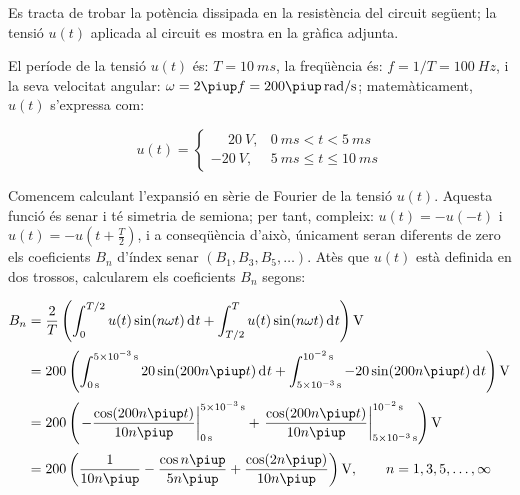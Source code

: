 \begin{exemple}\label{ex:CircuitFourier}
	\addcontentsxms{\CircuitFourier}
     Es tracta de trobar la potència
     dissipada en la resistència del circuit següent; la tensió $u(t)$ aplicada al circuit     es mostra en la gràfica adjunta.

    \begin{center}
        
    \end{center}

     El període de la tensió $u(t)$ és: $T=\qty{10}{ms}$, la freqüència és: $f=1/T=\qty{100}{Hz}$, i la
    seva velocitat angular: $\omega = 2\piup f = 200\piup\unit{\,rad/s}$;
    matemàticament, $u(t)$ s'expressa com:

    \[
    u(t) = \begin{cases} \phantom{-}\qty{20}{V}, & \qty{0}{ms} < t < \qty{5}{ms} \\
           \qty{-20}{V}, & \qty{5}{ms} \leq t \leq \qty{10}{ms} \end{cases}
    \]

    Comencem calculant l'expansió en sèrie de Fourier de la tensió
    $u(t)$. Aquesta funció és senar i té simetria de semiona; per tant,
     compleix: $u(t)=-u(-t)$ i $u(t) = -u(t+\frac{T}{2})$, i a conseqüència   d'això, únicament seran diferents de zero els coeficients $B_n$ d'índex senar $(B_1,B_3,B_5,\ldots)$. Atès que
    $u(t)$ està definida en dos trossos, calcularem els coeficients
    $B_n$ segons:

    \[
    \begin{split}
        B_n &= \frac{2}{T} \left( \int_0^{T/2} u(t) \sin(n \omega t) \diff t+
        \int_{T/2}^{T} u(t) \sin(n \omega t) \diff t\right) \unit{V} \\[0.5ex]
        &= 200 \left( \int_{\qty{0}{s}}^{\qty{5e-3}{s}} 20 \sin(200 n \piup t) \diff t+
        \int_{\qty{5e-3}{s}}^{\qty{e-2}{s}} -20 \sin(200 n \piup t) \diff t \right) \unit{V}\\[0.5ex]
        &= 200 \left( \left. -\frac{\cos(200 n \piup t)}{10 n \piup}\right|_{\qty{0}{s}}^{\qty{5e-3}{s}}
        +  \left.\frac{\cos(200 n \piup t)}{10 n \piup}\right|_{\qty{5e-3}{s}}^{\qty{e-2}{s}}\right) \unit{V}\\[0.5ex]
        &= 200\left( \frac{1}{10 n \piup} - \frac{\cos n \piup}{5 n \piup} +
        \frac{\cos (2 n \piup)}{10 n \piup}\right) \unit{V},
        \qquad n=1,3,5,\ldots,\infty
    \end{split}
    \]


\end{exemple}
